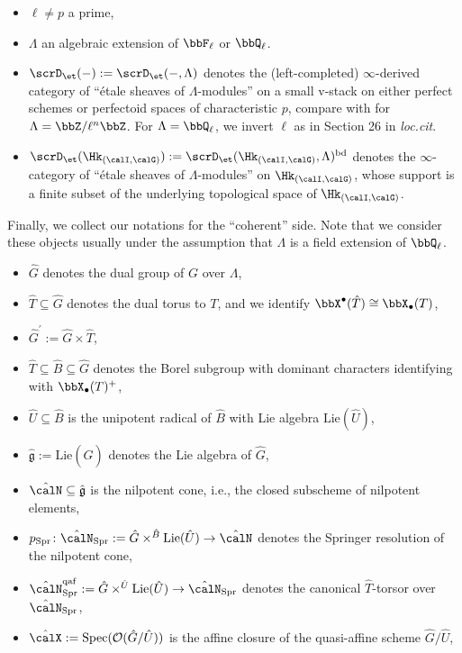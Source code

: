 \documentclass[10pt, reqno]{amsart}
\theoremstyle{plain}
\theoremstyle{definition}
\numberwithin{equation}{section}
\begin{document}
	\begin{itemize}
		\item $\ell\neq p$ a prime,
		\item $\Lambda$ an algebraic extension of $\bbF_\ell$ or $\bbQ_\ell$.  
		\item $\scrD_\et(-):=\scrD_\et(-,\Lambda)$ denotes the (left-completed) $\infty$-derived category of ``\'etale sheaves of $\Lambda$-modules'' on a small v-stack on either perfect schemes or perfectoid spaces of characteristic $p$, compare with \cite[Definition 1.7]{Sch17} for $\Lambda=\bbZ/\ell^n \bbZ$. For $\Lambda=\bbQ_\ell$, we invert $\ell$ as in Section 26 in \textit{loc.cit}.
		\item $\scrD_\et(\Hk_{(\calI,\calG)}):=\scrD_\et(\Hk_{(\calI,\calG)},\Lambda)^{\mathrm{bd}}$ denotes the $\infty$-category of ``\'etale sheaves of $\Lambda$-modules'' on $\Hk_{(\calI,\calG)}$, whose support is a finite subset of the underlying topological space of $\Hk_{(\calI,\calG)}$.
	\end{itemize}
	Finally, we collect our notations for the ``coherent'' side. Note that we consider these objects usually under the assumption that $\Lambda$ is a field extension of $\bbQ_\ell$.
	\begin{itemize}
		\item $\hat{G}$ denotes the dual group of $G$ over $\Lambda$,
		\item $\hat{T}\subseteq \hat{G}$ denotes the dual torus to $T$, and we identify $\bbX^\bullet(\hat{T})\cong \bbX_\bullet(T)$,
		\item $\hat{G}^\prime:=\hat{G}\times\hat{T}$,
		\item $\hat{T}\subseteq \hat{B}\subseteq \hat{G}$ denotes the Borel subgroup with dominant characters identifying with $\bbX_\bullet(T)^+$,
		\item $\hat{U}\subseteq \hat{B}$ is the unipotent radical of $\hat{B}$ with Lie algebra $\mathrm{Lie}(\hat{U})$,
		\item $\hat{\mathfrak{g}}:=\mathrm{Lie}(\hat{G})$ denotes the Lie algebra of $\hat{G}$,
		\item $\hat{\calN}\subseteq \hat{\mathfrak{g}}$ is the nilpotent cone, i.e., the closed subscheme of nilpotent elements,
		\item $p_{\mathrm{Spr}}\colon \hat{\calN}_{\mathrm{Spr}}:=\hat{G}\times^{\hat{B}}\mathrm{Lie}(\hat{U})\to \hat{\calN}$ denotes the Springer resolution of the nilpotent cone,
		\item $\hat{\calN}_{\mathrm{Spr}}^{\mathrm{qaf}}:=\hat{G}\times^{\hat{U}} \mathrm{Lie}(\hat{U})\to \hat{\calN}_{\mathrm{Spr}}$ denotes the canonical $\hat{T}$-torsor over $\hat{\calN}_{\mathrm{Spr}}$,
		\item $\hat{\calX}:=\mathrm{Spec}(\mathcal{O}(\hat{G}/\hat{U}))$ is the affine closure of the quasi-affine scheme $\hat{G}/\hat{U}$,
	\end{itemize}
	
\end{document}
